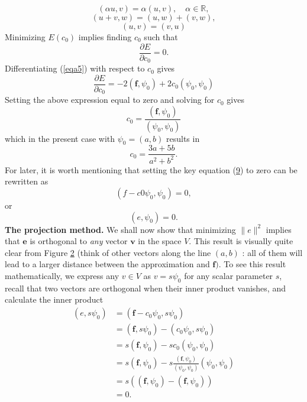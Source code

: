 \documentclass[../main.tex]{subfiles}
\begin{document}
\begin{equation}\label{eqa6}
	(\alpha u, v)=\alpha(u, v), \quad \alpha \in \mathbb{R},
\end{equation}
\begin{equation}\label{eqa7}
	(u + v, w)=(u, w)+(v, w),
\end{equation}
\begin{equation}\label{eqa8}
	(u, v)= (v, u)
\end{equation}
\indent Minimizing $E\left(c_{0}\right)$ implies finding $c_{0}$ such that
$$
\frac{\partial E}{\partial c_{0}}=0.
$$
Differentiating (\ref{eqa5}) with respect to $c_{0}$ gives
\begin{equation}\label{eqa9}
	\frac{\partial E}{\partial c_{0}}=-2\left(\boldsymbol{f}, \psi_{0}\right)+2 c_{0}\left(\psi_{0}, \psi_{0}\right)
\end{equation}
Setting the above expression equal to zero and solving for $c_{0}$ gives
\begin{equation}\label{eqa10}
	c_{0}=\frac{\left(\boldsymbol{f}, \psi_{0}\right)}{\left(\psi_{0}, \psi_{0}\right)}
\end{equation}
which in the present case with $\psi_{0}=(a, b)$ results in
\begin{equation}\label{eqa11}
	c_{0}=\frac{3 a+5 b}{a^{2}+b^{2}}.
\end{equation}
For later, it is worth mentioning that setting the key equation (\hyperref[eqa9]{9}) to zero can be rewritten as
$$
\left(f-c 0 \psi_{0}, \psi_{0}\right)=0,
$$
or
\begin{equation}\label{eqa12}
	\left(e, \psi_{0}\right)=0.
\end{equation}
\textbf{The projection method.} We shall now show that minimizing $\|e\|^{2}$ implies that $\boldsymbol{e}$ is orthogonal to \textit{any} vector $\boldsymbol{v}$ in the space $V$. This result is visually quite clear from Figure \hyperref[fig:img_2]{2} (think of other vectors along the line $(a, b)$ : all of them will lead to a larger distance between the approximation and $\boldsymbol{f})$. To see this result mathematically, we express any $v \in V$ as $v=s \psi_{0}$ for any scalar parameter $s$, recall that two vectors are orthogonal when their inner product vanishes, and calculate the inner product
$$
\begin{aligned}
	\left(e, s \psi_{0}\right) &=\left(\boldsymbol{f}-c_{0} \psi_{0}, s \psi_{0}\right) \\
	&=\left(\boldsymbol{f}, s \psi_{0}\right)-\left(c_{0} \psi_{0}, s \psi_{0}\right) \\
	&=s\left(\boldsymbol{f}, \psi_{0}\right)-s c_{0}\left(\psi_{0}, \psi_{0}\right) \\
	&=s\left(\boldsymbol{f}, \psi_{0}\right)-s \frac{\left(\boldsymbol{f}, \psi_{0}\right)}{\left(\psi_{0}, \psi_{0}\right)}\left(\psi_{0}, \psi_{0}\right) \\
	&=s\left(\left(\boldsymbol{f}, \psi_{0}\right)-\left(\boldsymbol{f}, \psi_{0}\right)\right) \\
	&=0 .
\end{aligned}
$$
\end{document}
